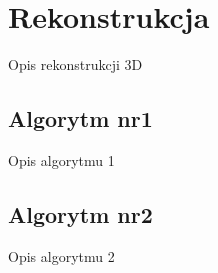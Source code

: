 \chapter{Rekonstrukcja}
Opis rekonstrukcji 3D

\section{Algorytm nr1}
Opis algorytmu 1

\section{Algorytm nr2}
Opis algorytmu 2